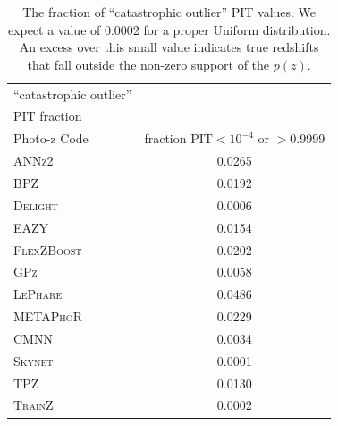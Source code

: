 \begin{table}
\setlength{\tabcolsep}{2pt}
\centering
\caption{The fraction of ``catastrophic outlier'' PIT values.  We expect a value of 0.0002 for a proper Uniform distribution.  An excess over this small value indicates true redshifts that fall outside the non-zero support of the $p(z)$.  }\label{tab:pitoutlier}
\begin{tabular}{lc}
\hline
\hline
 ``catastrophic outlier''\\ PIT fraction\\
\hline
Photo-z Code & fraction PIT$<10^{-4}$ or $>$0.9999\\
\hline
\textsc{ANNz2} & 0.0265\\
\textsc{BPZ} & 0.0192\\
\textsc{Delight} & 0.0006\\
\textsc{EAZY} & 0.0154\\
\textsc{FlexZBoost} & 0.0202\\
\textsc{GPz} & 0.0058\\
\textsc{LePhare} & 0.0486\\
\textsc{METAPhoR}& 0.0229\\
\textsc{CMNN} & 0.0034\\
\textsc{Skynet} & 0.0001\\
\textsc{TPZ} & 0.0130\\
\hline
\textsc{TrainZ} & 0.0002\\
\end{tabular}
\end{table}


